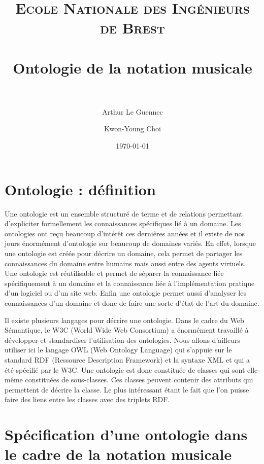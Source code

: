 \documentclass[paper=a4, fontsize=11pt]{scrartcl} %
\title{}
\title{	
\normalfont \normalsize 
\textsc{Ecole Nationale des Ingénieurs de Brest} \\ [25pt] %
\horrule{0.5pt} \\[0.4cm] %
\huge Ontologie de la notation musicale \\ %
\horrule{2pt} \\[0.5cm] %
}
\author{Arthur Le Guennec \and Kwon-Young Choi}
\date{\normalsize\today} %
\numberwithin{equation}{section} %
\numberwithin{figure}{section} %
\numberwithin{table}{section} %
\begin{document}
\maketitle %


\section{Ontologie : définition}

Une ontologie est un ensemble structuré de terme et de relations permettant d'expliciter formellement les connaissances spécifiques lié à un domaine.
Les ontologies ont reçu beaucoup d'intérêt ces dernières années et il existe de nos jours énormément d'ontologie sur beaucoup de domaines variés.
En effet, lorsque une ontologie est créée pour décrire un domaine, cela permet de partager les connaissances du domaine entre humains mais aussi entre des agents virtuels.
Une ontologie est réutilisable et permet de séparer la connaissance liée spécifiquement à un domaine et la connaissance liée à l'implémentation pratique d'un logiciel ou d'un site web.
Enfin une ontologie permet aussi d'analyser les connaissances d'un domaine et donc de faire une sorte d'état de l'art du domaine.

Il existe plusieurs langages pour décrire une ontologie.
Dans le cadre du Web Sémantique, le W3C (World Wide Web Consortium) a énormément travaillé à développer et standardiser l'utilisation des ontologies.
Nous allons d'ailleurs utiliser ici le langage OWL (Web Ontology Language) qui s'appuie sur le standard RDF (Ressource Description Framework) et la syntaxe XML et qui a été spécifié par le W3C. 
Une ontologie est donc constituée de classes qui sont elle-même constituées de sous-classes.
Ces classes peuvent contenir des attributs qui permettent de décrire la classe.
Le plus intéressant étant le fait que l'on puisse faire des liens entre les classes avec des triplets RDF.

\section{Spécification d'une ontologie dans le cadre de la notation musicale}
\end{document}
